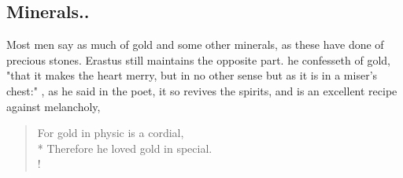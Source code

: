 {\subsection{Minerals..}
Most men say as much of gold and some other minerals, as these have done of precious stones. Erastus still maintains the opposite part.  he confesseth of gold, "that it makes the heart merry, but in no other sense but as it is in a miser's chest:" , as he said in the poet, it so revives the spirits, and is an excellent recipe against melancholy, 

{\gothfont
\begin{verse}
For gold in physic is a cordial,\\*
Therefore he loved gold in special.\\!
\end{verse}
}

}
